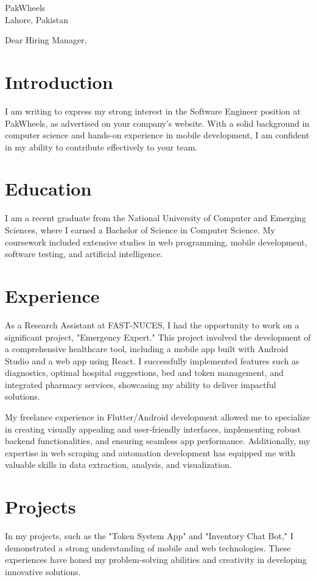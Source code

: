 \documentclass[letterpaper,11pt]{letter}
\def\companyname{PakWheels}
\def\position{Software Engineer }
\begin{document}
\begin{letter}{\companyname\\
                Lahore, Pakistan\\}

\opening{Dear Hiring Manager,}

\section*{Introduction}
I am writing to express my strong interest in the \position position at \companyname, as advertised on your company's website. With a solid background in computer science and hands-on experience in mobile development, I am confident in my ability to contribute effectively to your team.

\section*{Education}
I am a recent graduate from the National University of Computer and Emerging Sciences, where I earned a Bachelor of Science in Computer Science. My coursework included extensive studies in web programming, mobile development, software testing, and artificial intelligence.

\section*{Experience}
As a Research Assistant at FAST-NUCES, I had the opportunity to work on a significant project, "Emergency Expert." This project involved the development of a comprehensive healthcare tool, including a mobile app built with Android Studio and a web app using React. I successfully implemented features such as diagnostics, optimal hospital suggestions, bed and token management, and integrated pharmacy services, showcasing my ability to deliver impactful solutions.

My freelance experience in Flutter/Android development allowed me to specialize in creating visually appealing and user-friendly interfaces, implementing robust backend functionalities, and ensuring seamless app performance. Additionally, my expertise in web scraping and automation development has equipped me with valuable skills in data extraction, analysis, and visualization.

\section*{Projects}
In my projects, such as the "Token System App" and "Inventory Chat Bot," I demonstrated a strong understanding of mobile and web technologies. These experiences have honed my problem-solving abilities and creativity in developing innovative solutions.


\end{letter}
\end{document}
